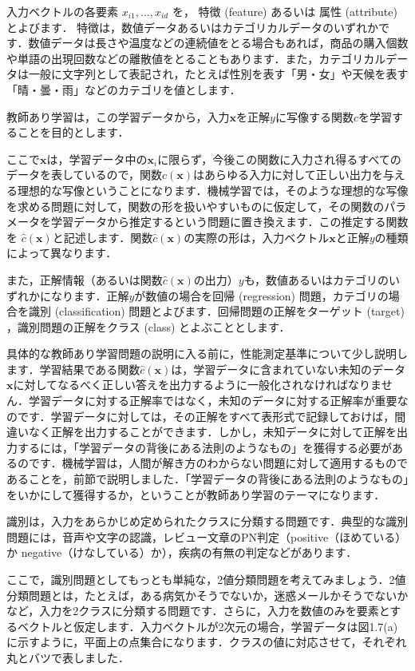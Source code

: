 入力ベクトルの各要素 $x_{i1},\dots,x_{id}$ を，
特徴 (feature)
 あるいは
 属性 (attribute) 
 とよびます．
特徴は，数値データあるいはカテゴリカルデータのいずれかです．数値データは長さや温度などの連続値をとる場合もあれば，商品の購入個数や単語の出現回数などの離散値をとることもあります．また，カテゴリカルデータは一般に文字列として表記され，たとえば性別を表す「男・女」や天候を表す「晴・曇・雨」などのカテゴリを値とします．

教師あり学習は，この学習データから，入力$\bm{x}$を正解$y$に写像する関数$c$を学習することを目的とします．

ここで$\bm{x}$は，学習データ中の$\bm{x}_i$に限らず，今後この関数に入力され得るすべてのデータを表しているので，関数$c(\bm{x})$はあらゆる入力に対して正しい出力を与える理想的な写像ということになります．機械学習では，そのような理想的な写像を求める問題に対して，関数の形を扱いやすいものに仮定して，その関数のパラメータを学習データから推定するという問題に置き換えます．この推定する関数を
$\hat{c}(\bm{x})$と記述します．関数$\hat{c}(\bm{x})$の実際の形は，入力ベクトル$\bm{x}$と正解$y$の種類によって異なります．

また，正解情報（あるいは関数$\hat{c}(\bm{x})$の出力）$y$も，数値あるいはカテゴリのいずれかになります．正解$y$が数値の場合を回帰 (regression) 問題，カテゴリの場合を識別 (classification) 問題とよびます．回帰問題の正解をターゲット (target) ，識別問題の正解をクラス (class) とよぶこととします．

具体的な教師あり学習問題の説明に入る前に，性能測定基準について少し説明します．学習結果である関数$\hat{c}(\bm{x})$は，学習データに含まれていない未知のデータ$\bm{x}$に対してなるべく正しい答えを出力するように一般化されなければなりません．学習データに対する正解率ではなく，未知のデータに対する正解率が重要なのです．学習データに対しては，その正解をすべて表形式で記録しておけば，間違いなく正解を出力することができます．しかし，未知データに対して正解を出力するには，「学習データの背後にある法則のようなもの」を獲得する必要があるのです．機械学習は，人間が解き方のわからない問題に対して適用するものであることを，前節で説明しました．「学習データの背後にある法則のようなもの」をいかにして獲得するか，ということが教師あり学習のテーマになります．


識別は，入力をあらかじめ定められたクラスに分類する問題です．典型的な識別問題には，音声や文字の認識，レビュー文章のPN判定（positive（ほめている）か negative（けなしている）か），疾病の有無の判定などがあります．

ここで，識別問題としてもっとも単純な，2値分類問題を考えてみましょう．2値分類問題とは，たとえば，ある病気かそうでないか，迷惑メールかそうでないかなど，入力を2クラスに分類する問題です．さらに，入力を数値のみを要素とするベクトルと仮定します．入力ベクトルが2次元の場合，学習データは図1.7(a)に示すように，平面上の点集合になります．クラスの値に対応させて，それぞれ丸とバツで表しました．

